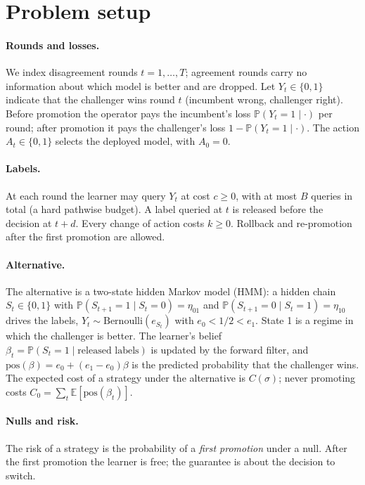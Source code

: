 \documentclass{article}
\theoremstyle{plain}
\theoremstyle{definition}
\theoremstyle{remark}
\newcommand{\PP}{\mathbb{P}}
\newcommand{\E}{\mathbb{E}}
\newcommand{\pos}{\mathrm{pos}}
\begin{document}
\section{Problem setup}
\label{sec:setup}

\paragraph{Rounds and losses.} We index disagreement rounds $t=1,\dots,T$; agreement rounds carry no information about which model is better and are dropped. Let $Y_t\in\{0,1\}$ indicate that the challenger wins round $t$ (incumbent wrong, challenger right). Before promotion the operator pays the incumbent's loss $\PP(Y_t=1\mid\cdot)$ per round; after promotion it pays the challenger's loss $1-\PP(Y_t=1\mid\cdot)$. The action $A_t\in\{0,1\}$ selects the deployed model, with $A_0=0$.

\paragraph{Labels.} At each round the learner may query $Y_t$ at cost $c\ge 0$, with at most $B$ queries in total (a hard pathwise budget). A label queried at $t$ is released before the decision at $t+d$. Every change of action costs $k\ge 0$. Rollback and re-promotion after the first promotion are allowed.

\paragraph{Alternative.} The alternative is a two-state hidden Markov model (HMM): a hidden chain $S_t\in\{0,1\}$ with $\PP(S_{t+1}=1\mid S_t=0)=\eta_{01}$ and $\PP(S_{t+1}=0\mid S_t=1)=\eta_{10}$ drives the labels, $Y_t\sim\mathrm{Bernoulli}(e_{S_t})$ with $e_0<1/2<e_1$. State 1 is a regime in which the challenger is better. The learner's belief $\beta_t=\PP(S_t=1\mid\text{released labels})$ is updated by the forward filter, and $\pos(\beta)=e_0+(e_1-e_0)\beta$ is the predicted probability that the challenger wins. The expected cost of a strategy under the alternative is $C(\sigma)$; never promoting costs $C_0=\sum_t\E[\pos(\beta_t)]$.

\paragraph{Nulls and risk.} The risk of a strategy is the probability of a \emph{first promotion} under a null. After the first promotion the learner is free; the guarantee is about the decision to switch.
\end{document}
